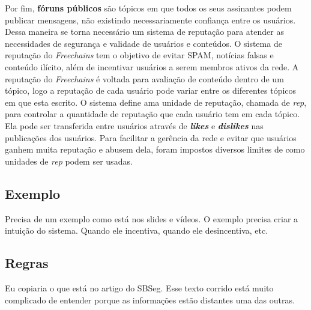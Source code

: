 \documentclass[12pt]{article}
\newcommand{\FC} {\emph{Freechains}\xspace}
\begin{document}
Por fim, \textbf{fóruns públicos} são tópicos em que todos os seus assinantes podem publicar mensagens, não existindo necessariamente confiança entre os usuários.  Dessa maneira se torna necessário um sistema de reputação para atender as necessidades de segurança e validade de usuários e conteúdos.
O sistema de reputação do \FC tem o objetivo de evitar SPAM, notícias falsas e conteúdo ilícito, além de incentivar usuários a serem membros ativos da rede.  A reputação do \FC é voltada para avaliação de conteúdo dentro de um tópico, logo a reputação de cada usuário pode variar entre os diferentes tópicos em que esta escrito. 
O sistema define ama unidade de reputação, chamada de \emph{rep}, para controlar a quantidade de reputação que cada usuário tem em cada tópico.  Ela pode ser transferida entre usuários através de \textbf{\emph{likes}} e \textbf{\emph{dislikes}} nas publicações dos usuários.  Para facilitar a gerência da rede e evitar que usuários ganhem muita reputação e abusem dela, foram impostos diversos limites de como unidades de \emph{rep} podem ser usadas. 




\subsection{Exemplo}

Precisa de um exemplo como está nos slides e vídeos.
O exemplo precisa criar a intuição do sistema.
Quando ele incentiva, quando ele desincentiva, etc.

\subsection{Regras}

Eu copiaria o que está no artigo do SBSeg.
Esse texto corrido está muito complicado de entender porque as informações estão distantes uma das outras.
\end{document}
